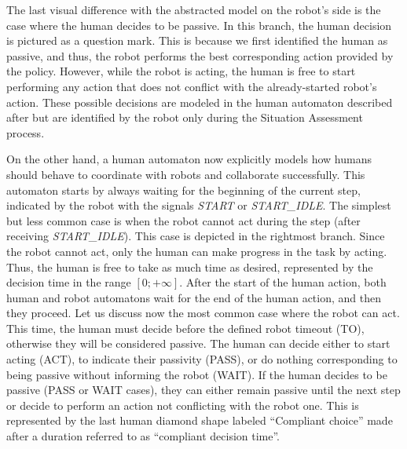 
The last visual difference with the abstracted model on the robot's side is the case where the human decides to be passive. In this branch, the human decision is pictured as a question mark. This is because we first identified the human as passive, and thus, the robot performs the best corresponding action provided by the policy. However, while the robot is acting, the human is free to start performing any action that does not conflict with the already-started robot's action. These possible decisions are modeled in the human automaton described after but are identified by the robot only during the Situation Assessment process. 

On the other hand, a human automaton now explicitly models how humans should behave to coordinate with robots and collaborate successfully. This automaton starts by always waiting for the beginning of the current step, indicated by the robot with the signals \textit{START} or \textit{START\_IDLE}. The simplest but less common case is when the robot cannot act during the step (after receiving \textit{START\_IDLE}). This case is depicted in the rightmost branch. Since the robot cannot act, only the human can make progress in the task by acting. Thus, the human is free to take as much time as desired, represented by the decision time in the range $[0; +\infty]$. After the start of the human action, both human and robot automatons wait for the end of the human action, and then they proceed.
Let us discuss now the most common case where the robot can act. This time, the human must decide before the defined robot timeout (TO), otherwise they will be considered passive. The human can decide either to start acting (ACT), to indicate their passivity (PASS), or do nothing corresponding to being passive without informing the robot (WAIT). If the human decides to be passive (PASS or WAIT cases), they can either remain passive until the next step or decide to perform an action not conflicting with the robot one. This is represented by the last human diamond shape labeled ``Compliant choice'' made after a duration referred to as ``compliant decision time''.


